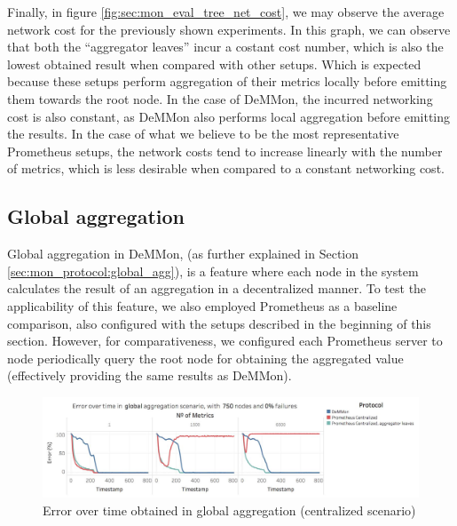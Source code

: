 Finally, in figure \ref{fig:sec:mon_eval_tree_net_cost}, we may observe the average network cost for the previously shown experiments. In this graph, we can observe that both the ``aggregator leaves'' incur a costant cost number, which is also the lowest obtained result when compared with other setups. Which is expected because these setups perform aggregation of their metrics locally before emitting them towards the root node. In the case of DeMMon, the incurred networking cost is also constant, as DeMMon also performs local aggregation before emitting the results. In the case of what we believe to be the most representative Prometheus setups, the network costs tend to increase linearly with the number of metrics, which is less desirable when compared to a constant networking cost.

\subsection{Global aggregation}

Global aggregation in DeMMon, (as further explained in Section \ref{sec:mon_protocol:global_agg}), is a feature where each node in the system calculates the result of an aggregation in a decentralized manner. To test the applicability of this feature, we also employed Prometheus as a baseline comparison, also configured with the setups described in the beginning of this section. However, for comparativeness, we configured each Prometheus server to node periodically query the root node for obtaining the aggregated value (effectively providing the same results as DeMMon).

\begin{figure}
    \centering
    \includegraphics[width=\linewidth]{Chapters/evaluation/figures/aggregation/Error_over_time_global_0_failures_centralized.jpg}
    \caption{Error over time obtained in global aggregation (centralized scenario)}
    \label{fig:sec:mon_eval_global_centralized}
\end{figure}

